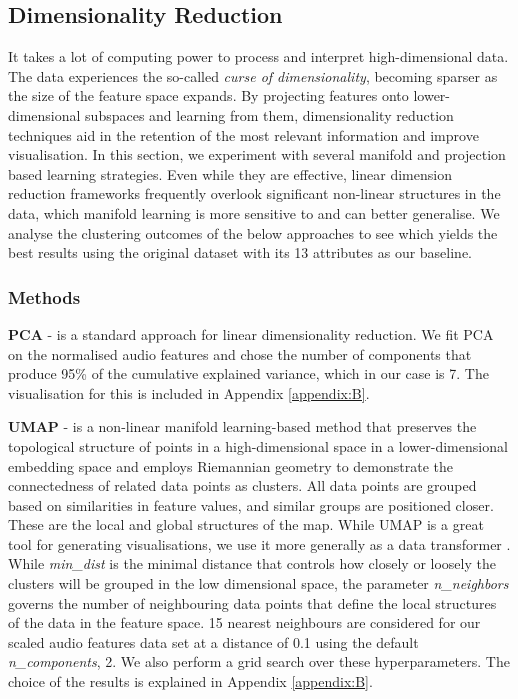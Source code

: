 \subsection{Dimensionality Reduction}
It takes a lot of computing power to process and interpret high-dimensional data. The data experiences the so-called \textit{curse of dimensionality}, becoming sparser as the size of the feature space expands. By projecting features onto lower-dimensional subspaces and learning from them, dimensionality reduction techniques aid in the retention of the most relevant information and improve visualisation. In this section, we experiment with several manifold and projection based learning strategies. Even while they are effective, linear dimension reduction frameworks frequently overlook significant non-linear structures in the data, which manifold learning is more sensitive to and can better generalise. We analyse the clustering outcomes of the below approaches to see which yields the best results using the original dataset with its 13 attributes as our baseline.

\subsubsection{Methods}
\textbf{PCA} - is a standard approach for linear dimensionality reduction. We fit PCA on the normalised audio features and chose the number of components that produce 95\% of the cumulative explained variance, which in our case is 7. The visualisation for this is included in Appendix \ref{appendix:B}.

\textbf{UMAP} - is a non-linear manifold learning-based method that preserves the topological structure of points in a high-dimensional space in a lower-dimensional embedding space and employs Riemannian geometry to demonstrate the connectedness of related data points as clusters. All data points are grouped based on similarities in feature values, and similar groups are positioned closer. These are the local and global structures of the map. While UMAP is a great tool for generating visualisations, we use it more generally as a data transformer \cite{umap}. While \textit{min\_dist} is the minimal distance that controls how closely or loosely the clusters will be grouped in the low dimensional space, the parameter \textit{n\_neighbors} governs the number of neighbouring data points that define the local structures of the data in the feature space. 15 nearest neighbours are considered for our scaled audio features data set at a distance of 0.1 using the default \textit{n\_components}, 2. We also perform a grid search over these hyperparameters. The choice of the results is explained in Appendix \ref{appendix:B}.

